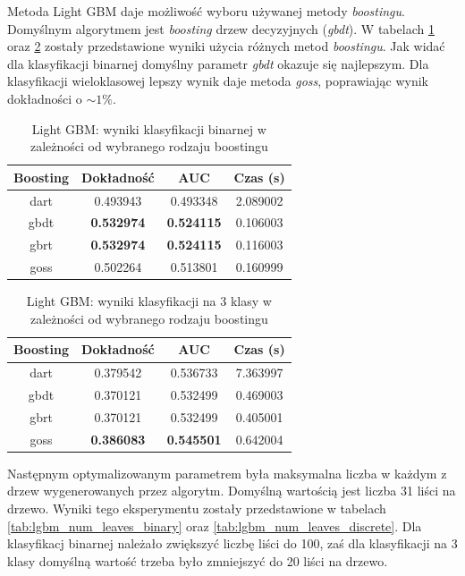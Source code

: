 \documentclass[a4paper, twoside, 11pt, openright]{article}
\begin{document}
Metoda Light GBM daje możliwość wyboru używanej metody \textit{boostingu}. Domyślnym algorytmem jest \textit{boosting} drzew decyzyjnych (\textit{gbdt}). W tabelach \ref{tab:lgbm_boosting_binary} oraz \ref{tab:lgbm_boosting_discrete} zostały przedstawione wyniki użycia różnych metod \textit{boostingu}. Jak widać dla klasyfikacji binarnej domyślny parametr \textit{gbdt} okazuje się najlepszym. Dla klasyfikacji wieloklasowej lepszy wynik daje metoda \textit{goss}, poprawiając wynik dokładności o $\sim 1\%$.

\begin{table}[H]
    \centering
    \begin{tabular}{|c|c|c|c|}
    \hline
        \textbf{Boosting} & \textbf{Dokładność} & \textbf{AUC} & \textbf{Czas (s)} \\ \hline
dart     &  0.493943 &  0.493348 &    2.089002 \\ \hline
gbdt     &  \textbf{0.532974} &  \textbf{0.524115} &    0.106003 \\ \hline
gbrt     &  \textbf{0.532974} &  \textbf{0.524115} &    0.116003 \\ \hline
goss     &  0.502264 &  0.513801 &    0.160999 \\ \hline
    \end{tabular}
    \caption{Light GBM: wyniki klasyfikacji binarnej w zależności od wybranego rodzaju boostingu}
    \label{tab:lgbm_boosting_binary}
\end{table}

\begin{table}[H]
    \centering
    \begin{tabular}{|c|c|c|c|}
    \hline
        \textbf{Boosting} & \textbf{Dokładność} & \textbf{AUC} & \textbf{Czas (s)} \\ \hline
dart     &  0.379542 &  0.536733 &    7.363997 \\ \hline
gbdt     &  0.370121 &  0.532499 &    0.469003 \\ \hline
gbrt     &  0.370121 &  0.532499 &    0.405001 \\ \hline
goss     &  \textbf{0.386083} &  \textbf{0.545501} &    0.642004 \\ \hline
    \end{tabular}
    \caption{Light GBM: wyniki klasyfikacji na 3 klasy w zależności od wybranego rodzaju boostingu}
    \label{tab:lgbm_boosting_discrete}
\end{table}

Następnym optymalizowanym parametrem była maksymalna liczba w każdym z drzew wygenerowanych przez algorytm. Domyślną wartością jest liczba 31 liści na drzewo. Wyniki tego eksperymentu zostały przedstawione w tabelach \ref{tab:lgbm_num_leaves_binary} oraz \ref{tab:lgbm_num_leaves_discrete}. Dla klasyfikacj binarnej należało zwiększyć liczbę liści do 100, zaś dla klasyfikacji na 3 klasy domyślną wartość trzeba było zmniejszyć do 20 liści na drzewo. 
\end{document}
